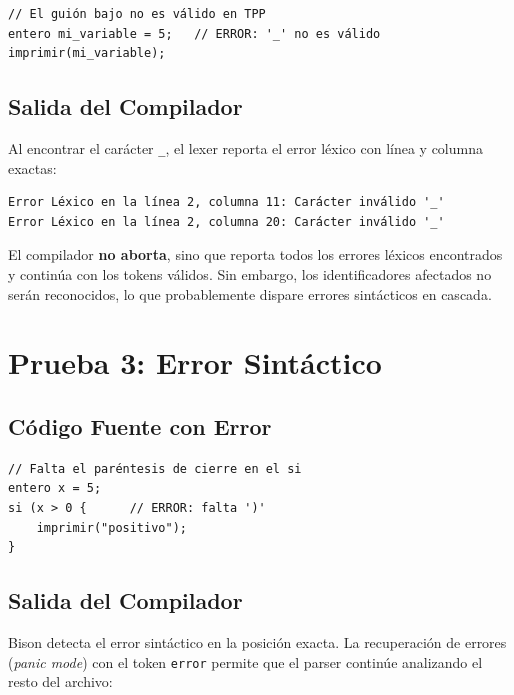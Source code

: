 \begin{lstlisting}[style=tppstyle, caption={Programa con error léxico: carácter inválido \_}]
// El guión bajo no es válido en TPP
entero mi_variable = 5;   // ERROR: '_' no es válido
imprimir(mi_variable);
\end{lstlisting}

\subsection{Salida del Compilador}

Al encontrar el carácter \texttt{\_}, el lexer reporta el error léxico con línea y columna exactas:

\begin{verbatim}
Error Léxico en la línea 2, columna 11: Carácter inválido '_'
Error Léxico en la línea 2, columna 20: Carácter inválido '_'
\end{verbatim}

El compilador \textbf{no aborta}, sino que reporta todos los errores léxicos encontrados y continúa con los tokens válidos. Sin embargo, los identificadores afectados no serán reconocidos, lo que probablemente dispare errores sintácticos en cascada.


\section{Prueba 3: Error Sintáctico}

\subsection{Código Fuente con Error}

\begin{lstlisting}[style=tppstyle, caption={Programa con error sintáctico: falta paréntesis}]
// Falta el paréntesis de cierre en el si
entero x = 5;
si (x > 0 {      // ERROR: falta ')'
    imprimir("positivo");
}
\end{lstlisting}

\subsection{Salida del Compilador}

Bison detecta el error sintáctico en la posición exacta. La recuperación de errores (\textit{panic mode}) con el token \texttt{error} permite que el parser continúe analizando el resto del archivo:


